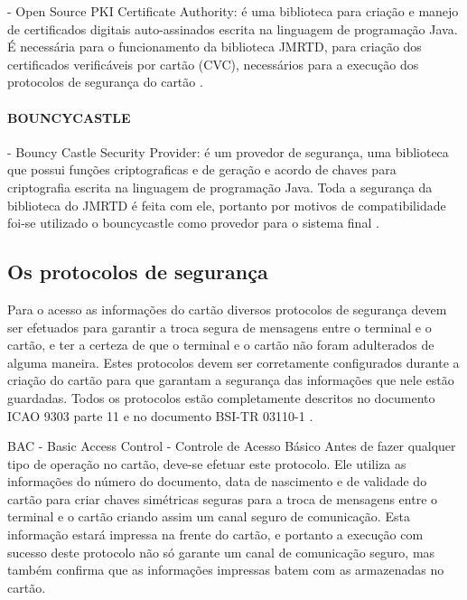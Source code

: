 \documentclass[11pt]{article}
\begin{document}
        - Open Source PKI Certificate Authority: é uma biblioteca para criação e manejo de certificados digitais auto-assinados escrita na linguagem de programação Java. É necessária para o funcionamento da biblioteca JMRTD, para criação dos certificados verificáveis por cartão (CVC), necessários para a execução dos protocolos de segurança do cartão \parencite{EJBCA}.
		
        \paragraph{BOUNCYCASTLE}
        
        - Bouncy Castle Security Provider: é um provedor de segurança, uma biblioteca que possui funções criptograficas e de geração e acordo de chaves para criptografia escrita na linguagem de programação Java. Toda a segurança da biblioteca do JMRTD é feita com ele, portanto por motivos de compatibilidade foi-se utilizado o bouncycastle como provedor para o sistema final \parencite{BOUNCYCASTLE}.

			
		

\subsection{Os protocolos de segurança}
		
		Para o acesso as informações do cartão diversos protocolos de segurança devem ser efetuados para garantir a troca segura de mensagens entre o terminal e o cartão, e ter a certeza de que o terminal e o cartão não foram adulterados de alguma maneira. Estes protocolos devem ser corretamente configurados durante a criação do cartão para que garantam a segurança das informações que nele estão guardadas. Todos os protocolos estão completamente descritos no documento ICAO 9303 parte 11 e no documento BSI-TR 03110-1 \parencite{BSI03110}.

		 BAC - Basic Access Control - Controle de Acesso Básico
		 Antes de fazer qualquer tipo de operação no cartão, deve-se efetuar este protocolo. Ele utiliza as informações do número do documento, data de nascimento e de validade do cartão para criar chaves simétricas seguras para a troca de mensagens entre o terminal e o cartão criando assim um canal seguro de comunicação. Esta informação estará impressa na frente do cartão, e portanto a execução com sucesso deste protocolo não só garante um canal de comunicação seguro, mas também confirma que as informações impressas batem com as armazenadas no cartão.
		
\end{document}
